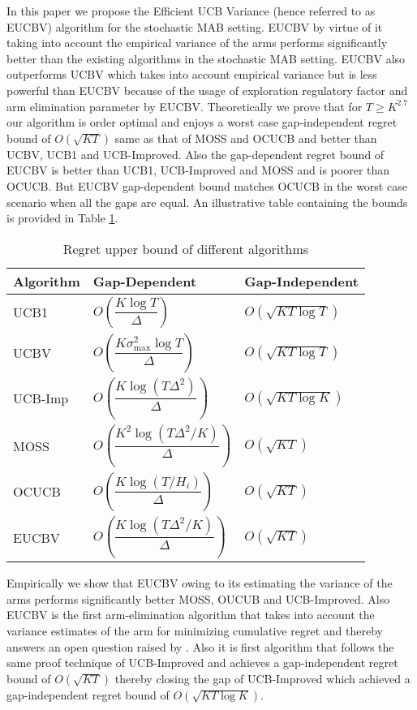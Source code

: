 In this paper we propose the Efficient UCB Variance (hence referred to as EUCBV) algorithm for the stochastic MAB setting. EUCBV by virtue of it taking into account the empirical variance of the arms performs significantly better than the existing algorithms in the stochastic MAB setting. EUCBV also  outperforms UCBV \cite{audibert2009exploration} which takes into account empirical variance but is less powerful than EUCBV because of the usage of exploration regulatory factor and arm elimination parameter by EUCBV. Theoretically we prove that for $T\geq K^{2.7}$ our algorithm is order optimal and enjoys a worst case gap-independent regret bound of $O\left( \sqrt{KT} \right)$ same as that of MOSS and OCUCB and better than UCBV, UCB1 and UCB-Improved. Also the gap-dependent regret bound of EUCBV is better than UCB1, UCB-Improved and MOSS and is poorer than OCUCB. But EUCBV gap-dependent bound matches OCUCB in the worst case scenario when all the gaps are equal. An illustrative table containing the bounds is provided in Table \ref{tab:comp-bds}.

\begin{table}
\caption{Regret upper bound of different algorithms}
\label{tab:comp-bds}
\begin{center}
\begin{tabular}{p{6em}p{12em}p{10em}}
\toprule
Algorithm  & Gap-Dependent & Gap-Independent \\
\hline
UCB1        & $O\left( \dfrac{K\log T}{\Delta} \right)$ & $O\left(\sqrt{KT\log T}\right)$ \\%
UCBV        & $O\left( \dfrac{K\sigma_{\max}^{2}\log T}{\Delta} \right)$ & $O\left(\sqrt{KT\log T}\right)$ \\
UCB-Imp 		& $O\left( \dfrac{K\log (T\Delta^2)}{\Delta} \right)$ & $O\left(\sqrt{KT\log K}\right)$ \\%
MOSS	     	& $O\left( \dfrac{K^2\log (T\Delta^2 /K)}{\Delta}\right)$ & $O\left(\sqrt{KT}\right)$\\%
OCUCB     	& $O\left( \dfrac{K\log (T/ H_{i})}{\Delta}\right)$ & $O\left(\sqrt{KT}\right)$\\
EUCBV		& $O\left( \dfrac{K\log (T\Delta^2 /K)}{\Delta}\right)$ & $O\left(\sqrt{KT}\right)$\\\midrule
\end{tabular}
\end{center}
\vspace*{-2em}
\end{table}


	Empirically we show that EUCBV owing to its estimating the variance of the arms performs significantly better MOSS, OUCUB and UCB-Improved. Also EUCBV is the first arm-elimination algorithm that takes into account the variance estimates of the arm for minimizing cumulative regret and thereby answers an open question raised by \citet{auer2010ucb}. Also it is first algorithm that follows the same proof technique of UCB-Improved and achieves a gap-independent regret bound of $O\left( \sqrt{KT} \right)$ thereby closing the gap of UCB-Improved \cite{auer2010ucb} which achieved a gap-independent regret bound of $O\left( \sqrt{KT\log K} \right)$.